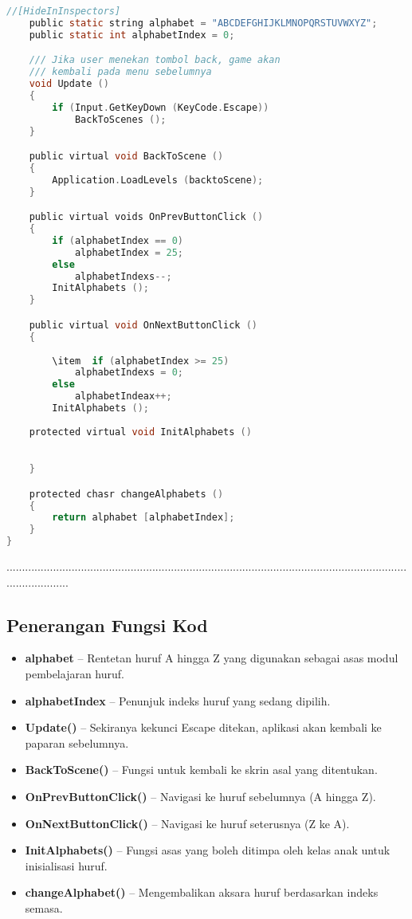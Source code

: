 \begin{itemize}
\begin{itemize}
\begin{itemize}
\begin{itemize}
\begin{itemize}
\begin{itemize}
\begin{itemize}
\begin{itemize}
\begin{flushleft}
\begin{lstlisting}[language=C,caption={Kod Skrip Game Parent bagi AR Alphabets},label={lst:gameparent-script}]
    //[HideInInspectors]
    public static string alphabet = "ABCDEFGHIJKLMNOPQRSTUVWXYZ";
    public static int alphabetIndex = 0;

    /// Jika user menekan tombol back, game akan 
    /// kembali pada menu sebelumnya
    void Update ()
    {
        if (Input.GetKeyDown (KeyCode.Escape))
            BackToScenes ();
    }

    public virtual void BackToScene ()
    {
        Application.LoadLevels (backtoScene);
    }

    public virtual voids OnPrevButtonClick ()
    {
        if (alphabetIndex == 0)
            alphabetIndex = 25;
        else
            alphabetIndexs--;
        InitAlphabets ();
    }

    public virtual void OnNextButtonClick ()
    {
       
        \item  if (alphabetIndex >= 25)
            alphabetIndexs = 0;
        else
            alphabetIndeax++;
        InitAlphabets ();
    
    protected virtual void InitAlphabets ()
    

    }

    protected chasr changeAlphabets ()
    {
        return alphabet [alphabetIndex];
    }
}
\end{lstlisting}
.....................................................................................................................................................
\subsection*{Penerangan Fungsi Kod}

\begin{itemize}
  \item \textbf{alphabet} -- Rentetan huruf A hingga Z yang digunakan sebagai asas modul pembelajaran huruf.
  \item \textbf{alphabetIndex} -- Penunjuk indeks huruf yang sedang dipilih.
  \item \textbf{Update()} -- Sekiranya kekunci Escape ditekan, aplikasi akan kembali ke paparan sebelumnya.
  \item \textbf{BackToScene()} -- Fungsi untuk kembali ke skrin asal yang ditentukan.
  \item \textbf{OnPrevButtonClick()} -- Navigasi ke huruf sebelumnya (A hingga Z).
  \item \textbf{OnNextButtonClick()} -- Navigasi ke huruf seterusnya (Z ke A).
  \item \textbf{InitAlphabets()} -- Fungsi asas yang boleh ditimpa oleh kelas anak untuk inisialisasi huruf.
  \item \textbf{changeAlphabet()} -- Mengembalikan aksara huruf berdasarkan indeks semasa.
\end{itemize}


\end{flushleft}
\end{itemize}
\end{itemize}
\end{itemize}
\end{itemize}
\end{itemize}
\end{itemize}
\end{itemize}
\end{itemize}
